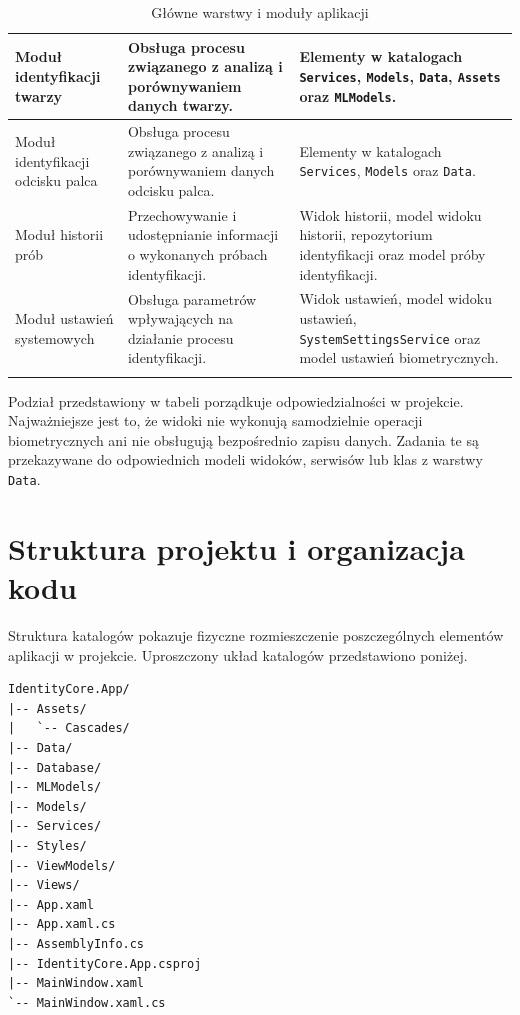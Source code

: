 \begin{xltabular}{\textwidth}{|p{2.9cm}|X|p{5.8cm}|}
    \hline
    Moduł identyfikacji \newline twarzy & Obsługa procesu związanego z \newline analizą i porównywaniem danych twarzy. & Elementy w katalogach \texttt{Services}, \texttt{Models}, \texttt{Data}, \texttt{Assets} oraz \texttt{MLModels}. \\
    \hline
    Moduł identyfikacji \newline odcisku palca & Obsługa procesu związanego z \newline analizą i porównywaniem danych odcisku palca. & Elementy w katalogach \texttt{Services}, \texttt{Models} oraz \texttt{Data}. \\
    \hline
    Moduł historii prób & Przechowywanie i udostępnianie informacji o wykonanych próbach identyfikacji. & Widok historii, model widoku historii, repozytorium identyfikacji oraz model próby identyfikacji. \\
    \hline
    Moduł ustawień \newline systemowych & Obsługa parametrów \newline wpływających na działanie procesu identyfikacji. & Widok ustawień, model widoku \newline ustawień, \texttt{SystemSettingsService} oraz model ustawień biometrycznych. \\
    \hline

    \caption{Główne warstwy i moduły aplikacji}
    \label{tab:warstwy-moduly}\\
\end{xltabular}

Podział przedstawiony w tabeli porządkuje odpowiedzialności w projekcie. Najważniejsze jest to, że widoki nie wykonują samodzielnie operacji biometrycznych ani nie obsługują bezpośrednio zapisu danych. Zadania te są przekazywane do odpowiednich modeli widoków, serwisów lub klas z warstwy \texttt{Data}.

\newpage

\section{Struktura projektu i organizacja kodu}

Struktura katalogów pokazuje fizyczne rozmieszczenie poszczególnych elementów aplikacji w projekcie. Uproszczony układ katalogów przedstawiono poniżej.

\begin{verbatim}
IdentityCore.App/
|-- Assets/
|   `-- Cascades/
|-- Data/
|-- Database/
|-- MLModels/
|-- Models/
|-- Services/
|-- Styles/
|-- ViewModels/
|-- Views/
|-- App.xaml
|-- App.xaml.cs
|-- AssemblyInfo.cs
|-- IdentityCore.App.csproj
|-- MainWindow.xaml
`-- MainWindow.xaml.cs
\end{verbatim}

